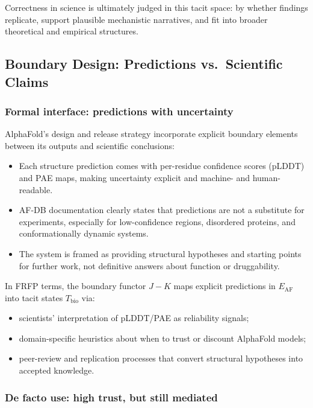 Correctness in science is ultimately judged in this tacit space:
by whether findings replicate, support plausible mechanistic narratives, and
fit into broader theoretical and empirical structures.

\subsection{Boundary Design: Predictions vs.\ Scientific Claims}

\subsubsection*{Formal interface: predictions with uncertainty}

AlphaFold’s design and release strategy incorporate explicit boundary
elements between its outputs and scientific conclusions:

\begin{itemize}
  \item Each structure prediction comes with per-residue confidence scores
        (pLDDT) and PAE maps, making uncertainty explicit and machine- and
        human-readable.
  \item AF-DB documentation clearly states that predictions are not a
        substitute for experiments, especially for low-confidence regions,
        disordered proteins, and conformationally dynamic systems.
  \item The system is framed as providing structural hypotheses and
        starting points for further work, not definitive answers about
        function or druggability.
\end{itemize}

In FRFP terms, the boundary functor \(J{-}K\) maps explicit predictions in
\(E_{\mathrm{AF}}\) into tacit states \(T_{\mathrm{bio}}\) via:

\begin{itemize}
  \item scientists’ interpretation of pLDDT/PAE as reliability signals;
  \item domain-specific heuristics about when to trust or discount
        AlphaFold models;
  \item peer-review and replication processes that convert structural
        hypotheses into accepted knowledge.
\end{itemize}

\subsubsection*{De facto use: high trust, but still mediated}

